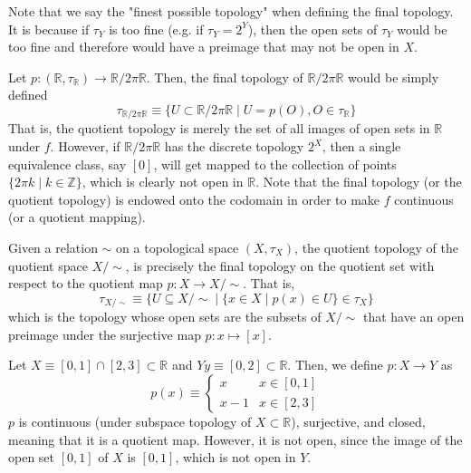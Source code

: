 \documentclass{article}
\begin{document}
    Note that we say the "finest possible topology" when defining the final topology. It is because if $\tau_Y$ is too fine (e.g. if $\tau_Y = 2^Y$), then the open sets of $\tau_Y$ would be too fine and therefore would have a preimage that may not be open in $X$. 

    \begin{example}
    Let $p: (\mathbb{R}, \tau_\mathbb{R}) \longrightarrow \mathbb{R} / 2 \pi \mathbb{R}$. Then, the final topology of $\mathbb{R} / 2 \pi \mathbb{R}$ would be simply defined 
    \[\tau_{\mathbb{R} / 2 \pi \mathbb{R}} \equiv \{U \subset \mathbb{R} / 2\pi \mathbb{R} \; | \; U = p(O), O \in \tau_\mathbb{R}\}\]
    That is, the quotient topology is merely the set of all images of open sets in $\mathbb{R}$ under $f$. However, if $\mathbb{R} / 2 \pi \mathbb{R}$ has the discrete topology $2^X$, then a single equivalence class, say $[0]$, will get mapped to the collection of points $\{2 \pi k \; | \; k \in \mathbb{Z}\}$, which is clearly not open in $\mathbb{R}$. Note that the final topology (or the quotient topology) is endowed onto the codomain in order to make $f$ continuous (or a quotient mapping). 
    \end{example}

    \begin{proposition}
    Given a relation $\sim$ on a topological space $(X, \tau_X)$, the quotient topology of the quotient space $X / \sim$, is precisely the final topology on the quotient set with respect to the quotient map $p: X \longrightarrow X / \sim$. That is, 
    \[\tau_{X / \sim} \equiv \big\{U \subseteq X / \sim \; | \; \{x \in X \; | \; p(x) \in U\} \in \tau_X \big\}\]
    which is the topology whose open sets are the subsets of $X / \sim$ that have an open preimage under the surjective map $p: x \mapsto [x]$. 
    \end{proposition}

    \begin{example}
    Let $X \equiv [0,1] \cap [2,3] \subset \mathbb{R}$ and $Y y \equiv [0,2] \subset \mathbb{R}$. Then, we define $p: X \longrightarrow Y$ as 
    \[p(x) \equiv \begin{cases}
          x & x \in [0,1] \\
          x-1 & x \in [2,3]
    \end{cases}\]
    $p$ is continuous (under subspace topology of $X \subset \mathbb{R}$), surjective, and closed, meaning that it is a quotient map. However, it is not open, since the image of the open set $[0,1]$ of $X$ is $[0,1]$, which is not open in $Y$. 
    \end{example}
\end{document}
